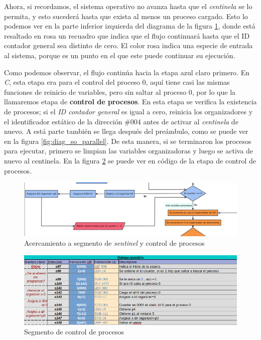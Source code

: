 \documentclass[letterpaper,12pt,oneside]{book}
\begin{document}
			
				Ahora, si recordamos, el sistema operativo no avanza hasta que el \textit{centinela} se lo permita, y esto sucederá hasta que
				exista al menos un proceso cargado. Esto lo podemos ver en la parte inferior izquierda del diagrama de
				la figura \ref{fig:diag_somp_waiter}, donde
				está resaltado en rosa un recuadro que indica que el flujo continuará hasta que el ID contador general sea distinto de cero. El
				color
				rosa indica una especie de entrada al sistema, porque es un punto en el que este puede continuar su ejecución.
    
                Como
				podemos observar, el flujo continúa  hacia la etapa azul claro primero. 
				En \textit{C}, esta etapa era para el control del proceso 0, aquí tiene casi las mismas funciones de
				reinicio de variables, pero sin saltar al proceso 0, por lo que la llamaremos etapa de \textbf{control de procesos}.
				 En esta etapa
				se verifica la existencia de procesos; si el \textit{ID contador general} es igual a cero,
				reinicia los organizadores y el identificador estático de la dirección \#004  antes
				de activar al \textit{centinela} de nuevo. A está parte también se llega después del preámbulo, como se puede ver en la
				figura \ref{fig:diag_so_parallel}.				
				 De esta manera, si se terminaron los procesos para ejecutar, primero se limpian las variables organizadoras y
				 luego se activa de nuevo al centinela. En la figura \ref{fig:somp_controlprocesos} se puede ver en código
				 de la etapa de control de procesos.
			
			
			\begin{figure}[h]		
				\centering
				\includegraphics[scale=0.45]{media/Paralela/diag_somp_waiter.png}
				\caption{ Acercamiento a segmento de  \textit{sentinel} y control de procesos}
				\label{fig:diag_somp_waiter}
			\end{figure}	
			
			
			\begin{figure}[h]		
				\centering
				\includegraphics[scale=0.53]{media/Paralela/somp_controlprocesos.png}
				\caption{Segmento de control de procesos}
				\label{fig:somp_controlprocesos}
			\end{figure}	
			
\end{document}
